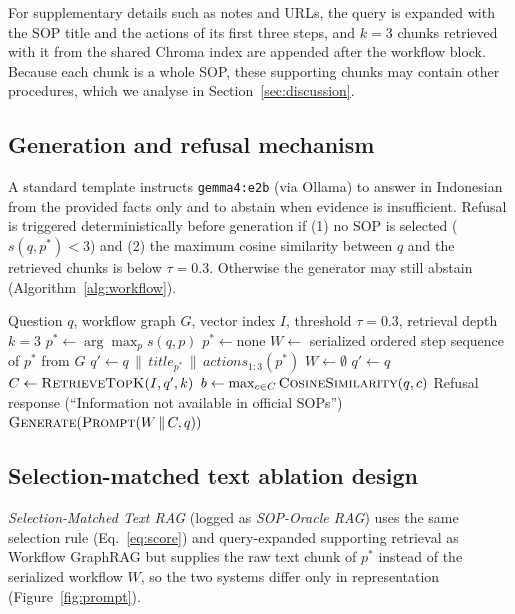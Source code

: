 \documentclass[a4paper,fleqn]{cas-dc}
\begin{document}
For supplementary details such as notes and URLs, the query is expanded with the SOP title and the actions of its first three steps, and $k=3$ chunks retrieved with it from the shared Chroma index are appended after the workflow block. Because each chunk is a whole SOP, these supporting chunks may contain other procedures, which we analyse in Section~\ref{sec:discussion}.

\subsection{Generation and refusal mechanism}
A standard template instructs \texttt{gemma4:e2b} (via Ollama) to answer in Indonesian from the provided facts only and to abstain when evidence is insufficient. Refusal is triggered deterministically before generation if (1) no SOP is selected ($s(q,p^\ast)<3$) and (2) the maximum cosine similarity between $q$ and the retrieved chunks is below $\tau=0.3$. Otherwise the generator may still abstain (Algorithm~\ref{alg:workflow}).

\begin{algorithm}[!htbp]
\caption{Execution pipeline of Process-Aware Workflow GraphRAG}
\label{alg:workflow}
\begin{algorithmic}[1]
\REQUIRE Question $q$, workflow graph $G$, vector index $I$, threshold $\tau = 0.3$, retrieval depth $k=3$
\STATE $p^\ast \leftarrow \arg\max_p s(q,p)$ 
  \STATE $p^\ast \leftarrow \text{none}$
\ENDIF
{}
  \STATE $W \leftarrow$ serialized ordered step sequence of $p^\ast$ from $G$
  \STATE $q' \leftarrow q \,\|\, \textit{title}_{p^\ast} \,\|\, \textit{actions}_{1:3}(p^\ast)$ 
\ELSE
  \STATE $W \leftarrow \emptyset$
  \STATE $q' \leftarrow q$ 
\ENDIF
\STATE $C \leftarrow \textsc{RetrieveTopK}(I, q', k)$
\STATE $b \leftarrow \max_{c \in C} \textsc{CosineSimilarity}(q, c)$
  \RETURN Refusal response (``Information not available in official SOPs'')
\ENDIF
\RETURN $\textsc{Generate}(\textsc{Prompt}(W \,\|\, C, q))$
\end{algorithmic}
\end{algorithm}

\subsection{Selection-matched text ablation design}
\label{sec:ablation-oracle}
\emph{Selection-Matched Text RAG} (logged as \emph{SOP-Oracle RAG}) uses the same selection rule (Eq.~\eqref{eq:score}) and query-expanded supporting retrieval as Workflow GraphRAG but supplies the raw text chunk of $p^\ast$ instead of the serialized workflow $W$, so the two systems differ only in representation (Figure~\ref{fig:prompt}).
\end{document}
